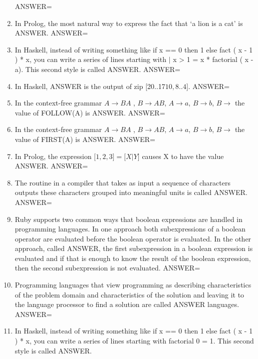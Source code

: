\documentclass{exam}
\begin{document}
\begin{enumerate}
ANSWER=
\item In Prolog, the most natural way to express the fact that `a lion is a cat' is ANSWER.\newline
ANSWER=
\item In Haskell, instead of writing something like if x == 0 then 1 else fact ( x - 1 ) * x, you can write a series of lines starting with $|$ x > 1 = x * factorial ( x - a).  This second style is called ANSWER.\newline
ANSWER=
\item In Haskell, ANSWER is the output of zip $\lbrack$20..17\rbrack$ $\lbrack$10,8..4\rbrack$.\newline
ANSWER=
\item In the context-free grammar $A \rightarrow B A$ , $B \rightarrow A B$, $A \rightarrow a$, $B \rightarrow b$, $B \rightarrow$  the value of FOLLOW(A) is ANSWER.\newline
ANSWER=
\item In the context-free grammar $A \rightarrow B A$ , $B \rightarrow A B$, $A \rightarrow a$, $B \rightarrow b$, $B \rightarrow$  the value of FIRST(A) is ANSWER.\newline
ANSWER=
\item In Prolog, the expression $\lbrack 1, 2, 3\rbrack = \lbrack X | Y\rbrack$ causes X to have the value ANSWER.\newline
ANSWER=
\item The routine in a compiler that takes as input a sequence of characters outputs these characters grouped into meaningful units is called ANSWER.\newline
ANSWER=
\item Ruby supports two common ways that boolean expressions are handled in programming languages.  In one approach both subexpressions of a boolean operator are evaluated before the boolean operator is evaluated.  In the other approach, called ANSWER, the first subexpression in a boolean expression is evaluated and if that is enough to know the result of the boolean expression, then the second subexpression is not evaluated.\newline
ANSWER=
\item Programming languages that view programming as describing characteristics of the problem domain and characteristics of the solution and leaving it to the language processor to find a solution are called ANSWER languages.\newline
ANSWER=
\item In Haskell, instead of writing something like if x == 0 then 1 else fact ( x - 1 ) * x, you can write a series of lines starting with factorial 0 = 1.  This second style is called ANSWER.\newline

\end{enumerate}
\end{document}
